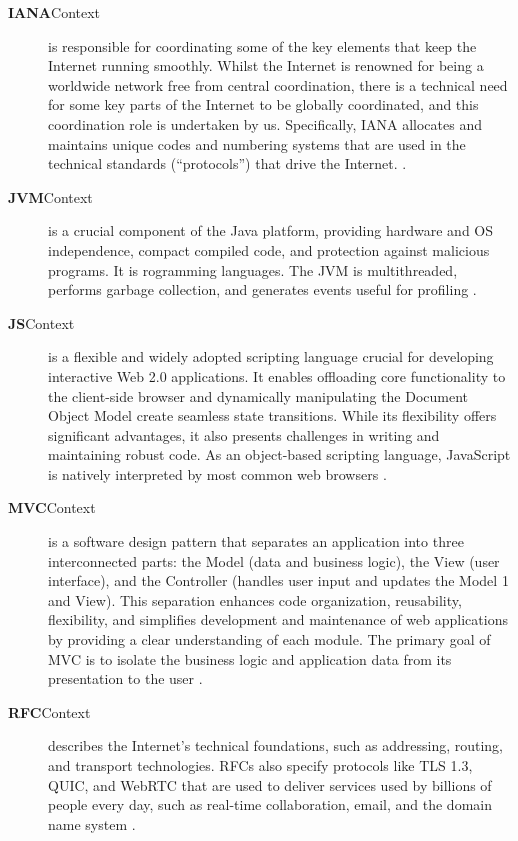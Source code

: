 \begin{description}
\item[\textbf{IANA}Context] is responsible for coordinating some of the key elements that keep the Internet running smoothly. Whilst the Internet is renowned for being a worldwide network free from central coordination, there is a technical need for some key parts of the Internet to be globally coordinated, and this coordination role is undertaken by us.
Specifically, IANA allocates and maintains unique codes and numbering systems that are used in the technical standards (“protocols”) that drive the Internet. \cite{iana_about}.

\item[\textbf{JVM}Context]  is a crucial component of the Java platform, providing hardware and OS independence, compact compiled code, and protection against malicious programs. It is rogramming languages. The JVM is multithreaded, performs garbage collection, and generates events useful for profiling \cite{lindholm2014java, viswanathan2000java}.

\item[\textbf{JS}Context] is a flexible and widely adopted scripting language crucial for developing interactive Web 2.0 applications. It enables offloading core functionality to the client-side browser and dynamically manipulating the Document Object Model create seamless state transitions. While its flexibility offers significant advantages, it also presents challenges in writing and maintaining robust code. As an object-based scripting language, JavaScript is natively interpreted by most common web browsers \cite{fard2013jsnose, stothard2000sequence}.

\item[\textbf{MVC}Context] is a software design pattern that separates an application into three interconnected parts: the Model (data and business logic), the View (user interface), and the Controller (handles user input and updates the Model 1  and View). This separation enhances code organization, reusability, flexibility, and simplifies development and maintenance of web applications by providing a clear understanding of each module. The primary goal of MVC is to isolate the business logic and application data from its presentation to the user \cite{jivani2013over, singh2016comparative, thakur2019role, thakur2019study}.

\item[\textbf{RFC}Context] describes the Internet's technical foundations, such as addressing, routing, and transport technologies. RFCs also specify protocols like TLS 1.3, QUIC, and WebRTC that are used to deliver services used by billions of people every day, such as real-time collaboration, email, and the domain name system \cite{ietf_rfc_website}.


\end{description}

